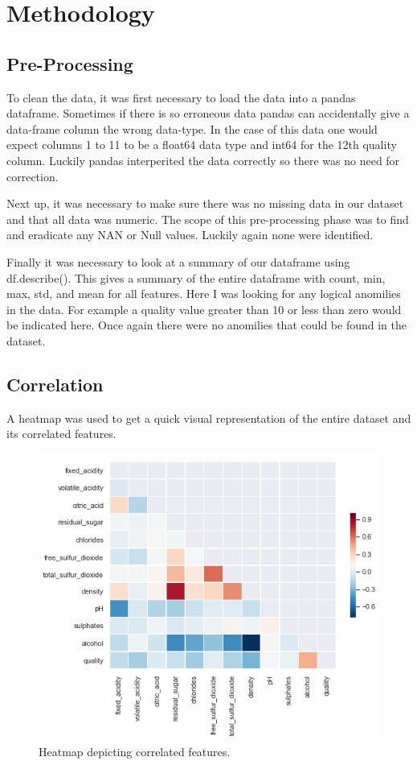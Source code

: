 \section{Methodology}

\subsection{Pre-Processing}

To clean the data, it was first necessary to load the data into a pandas dataframe. Sometimes if there is so erroneous data pandas can accidentally give a data-frame column the wrong data-type. In the case of this data one would expect columns 1 to 11 to be a float64 data type and int64 for the 12th quality column. Luckily pandas interperited the data correctly so there was no need for correction. 

Next up, it was necessary to make sure there was no missing data in our dataset and that all data was numeric. The scope of this pre-processing phase was to find and eradicate any NAN or Null values. Luckily again none were identified.

Finally it was necessary to look at a summary of our dataframe using df.describe(). This gives a summary of the entire dataframe with count, min, max, std, and mean for all features. Here I was looking for any logical anomilies in the data. For example a quality value greater than 10 or less than zero would be indicated here. Once again there were no anomilies that could be found in the dataset. 

\subsection{Correlation}

A heatmap was used to get a quick visual representation of the entire dataset and its correlated features.

\begin{figure}[H]
\centering
        \includegraphics[totalheight=8cm]{images/correlation.png}
    \caption{Heatmap depicting correlated features.}
    \label{fig:heatmap}
\end{figure}

